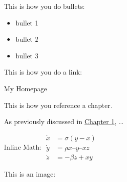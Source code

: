 \documentclass[12pt,12pt,a4paper,oneside,bibliography=totoc]{scrbook}
\begin{document}
\frontmatter

  
  
  
  

\clearpage

  \hypersetup{linkcolor=black}
  \setcounter{tocdepth}{2}
    \tableofcontents
    \pagestyle{plain}
    \cleardoublepage

    \listoftables
  \restoregeometry
  \clearpage

    \listoffigures
  \restoregeometry
  \clearpage

      \clearpairofpagestyles
      \cfoot[\pagemark]{\pagemark}
      \lehead{\headmark}
      \rohead{\headmark}
      \pagestyle{scrheadings}
  
\mainmatter


This is how you do bullets:

\begin{itemize}
\itemsep1pt\parskip0pt
\item
  bullet 1
\item
  bullet 2
\item
  bullet 3
\end{itemize}

This is how you do a link:

My \href{www.thomaskieffer.com}{Homepage}

This is how you reference a chapter.

As previously discussed in \hyperref[intro]{Chapter 1}, \ldots{}

Inline Math:
\(\begin{aligned} \dot{x} & = \sigma(y-x) \\ \dot{y} & = \rho x – y – xz \\ \dot{z} & = -\beta z + xy \end{aligned}\)

This is an image:
\end{document}
